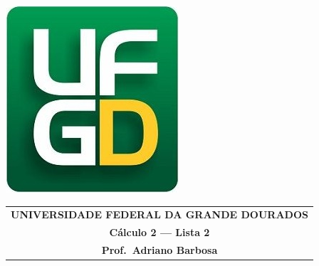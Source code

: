 \documentclass[a4paper,5pt]{amsbook}
\begin{document}
\thispagestyle{empty}
\pagestyle{empty}
\begin{minipage}[h]{0.14\textwidth}
	\includegraphics[scale=0.24]{../../ufgd.png}
\end{minipage}
\begin{minipage}[h]{\textwidth}
\begin{tabular}{c}
{{\bf UNIVERSIDADE FEDERAL DA GRANDE DOURADOS}}\\
{{\bf C\'alculo 2 --- Lista 2}}\\
{{\bf Prof.\ Adriano Barbosa}}\\
\end{tabular}
\vspace{-0.45cm}
%
\end{minipage}

\end{document}

